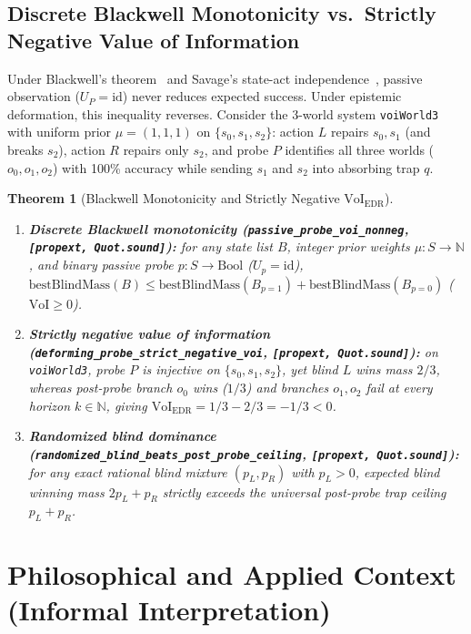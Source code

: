 \documentclass[10pt,a4paper]{article}
\theoremstyle{cleanthm}
\newtheorem{theorem}{Theorem}[section]
\theoremstyle{cleandef}
\begin{document}
\subsection{Discrete Blackwell Monotonicity vs.\ Strictly Negative Value of Information}

Under Blackwell's theorem~\cite{blackwell1953} and Savage's state-act independence~\cite{savage1954}, passive observation ($U_P=\mathrm{id}$) never reduces expected success. Under epistemic deformation, this inequality reverses. Consider the 3-world system \texttt{voiWorld3} with uniform prior $\mu=(1,1,1)$ on $\{s_0,s_1,s_2\}$: action $L$ repairs $s_0,s_1$ (and breaks $s_2$), action $R$ repairs only $s_2$, and probe $P$ identifies all three worlds ($o_0,o_1,o_2$) with 100\% accuracy while sending $s_1$ and $s_2$ into absorbing trap $q$.

\begin{theorem}[Blackwell Monotonicity and Strictly Negative $\mathrm{VoI}_{\mathrm{EDR}}$]
\label{thm:voi}
\begin{enumerate}
  \item \textbf{Discrete Blackwell monotonicity (\texttt{passive\_\allowbreak probe\_\allowbreak voi\_\allowbreak nonneg}, \texttt{[propext, Quot.sound]}):} for any state list $B$, integer prior weights $\mu:S\to\mathbb{N}$, and binary passive probe $p:S\to\mathrm{Bool}$ ($U_p=\mathrm{id}$), $\mathrm{bestBlindMass}(B)\le\mathrm{bestBlindMass}(B_{p=1})+\mathrm{bestBlindMass}(B_{p=0})$ ($\mathrm{VoI}\ge 0$).
  \item \textbf{Strictly negative value of information (\texttt{deforming\_\allowbreak probe\_\allowbreak strict\_\allowbreak negative\_\allowbreak voi}, \texttt{[propext, Quot.sound]}):} on \texttt{voiWorld3}, probe $P$ is injective on $\{s_0,s_1,s_2\}$, yet blind $L$ wins mass $2/3$, whereas post-probe branch $o_0$ wins ($1/3$) and branches $o_1,o_2$ fail at \emph{every} horizon $k\in\mathbb{N}$, giving $\mathrm{VoI}_{\mathrm{EDR}}=1/3-2/3=-1/3<0$.
  \item \textbf{Randomized blind dominance (\texttt{randomized\_\allowbreak blind\_\allowbreak beats\_\allowbreak post\_\allowbreak probe\_\allowbreak ceiling}, \texttt{[propext, Quot.sound]}):} for any exact rational blind mixture $(p_L,p_R)$ with $p_L>0$, expected blind winning mass $2p_L+p_R$ strictly exceeds the universal post-probe trap ceiling $p_L+p_R$.
\end{enumerate}
\end{theorem}

\section{Philosophical and Applied Context (Informal Interpretation)}
\end{document}

